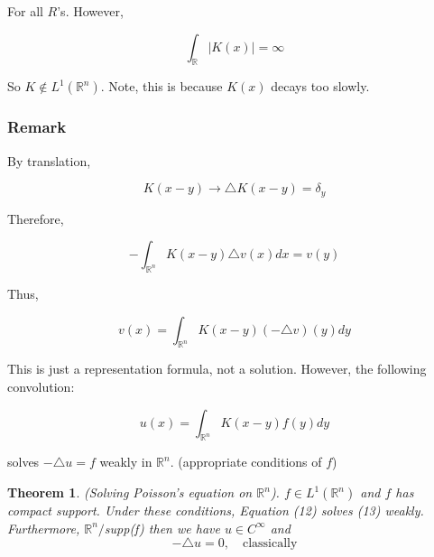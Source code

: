 \documentclass{article}
\newtheorem{theorem}{Theorem}[section]
\newtheorem{one minute paper}[theorem]{One Minute Paper}
\begin{document}
For all $R$'s. However, 

\begin{equation}
    \int_{\mathbb{R}}|K(x)| = \infty
\end{equation}

So $K \notin L^1(\mathbb{R}^n)$. Note, this is because $K(x)$ decays too slowly. 

\subsubsection*{Remark}

By translation,

\begin{equation}
    K(x-y) \rightarrow \triangle K(x-y) = \delta_y
\end{equation}

Therefore, 

\begin{equation}
    -\int_{\mathbb{R}^n}K(x-y)\triangle v(x)dx = v(y)
\end{equation}

Thus, 

\begin{equation}
    v(x) = \int_{\mathbb{R}^n}K(x-y)(-\triangle v)(y)dy
\end{equation}

This is just a representation formula, not a solution. However, the following convolution:

\begin{equation}
    u(x) = \int_{\mathbb{R}^n}K(x-y)f(y)dy
\end{equation}

solves $-\triangle u = f$ weakly in $\mathbb{R}^n$. (appropriate conditions of $f$) 

\begin{theorem}
    (Solving Poisson's equation on $\mathbb{R}^n$). $f \in L^1(\mathbb{R}^n)$ and $f$ has compact support. Under these conditions, Equation (12) solves (13) weakly. 
    Furthermore, $\mathbb{R}^n / $supp(f) then we have $u \in C^{\infty}$ and 
    \begin{equation}
        -\triangle u = 0, \quad \text{classically} 
    \end{equation}
\end{theorem}
\end{document}
